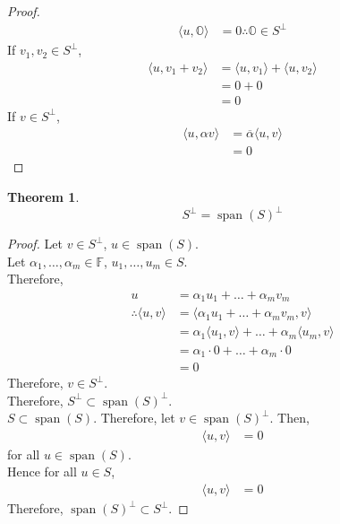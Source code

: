 \documentclass[fleqn, a4paper, 12pt]{article}
\DeclareMathOperator{\vspan}{\mathrm{span}} %
\theoremstyle{definition}
\theoremstyle{theorem}
\newtheorem{theorem}{Theorem} %
\theoremstyle{remark}
\numberwithin{corollary}{theorem}
\numberwithin{equation}{theorem}
\begin{document}
\begin{proof}
	\begin{align*}
		\langle u, \mathbb{O} \rangle &= 0
		\therefore \mathbb{O} \in S^{\perp}
	\end{align*}
	If $v_1, v_2 \in S^{\perp}$, 
	\begin{align*}
		\langle u, v_1 + v_2 \rangle &= \langle u, v_1 \rangle + \langle u, v_2 \rangle\\
		&= 0 + 0\\
		&= 0
	\end{align*}
	If $v \in S^{\perp}$,
	\begin{align*}
		\langle u, \alpha v \rangle &= \overline{\alpha} \langle u, v \rangle\\
		&= 0
	\end{align*}
\end{proof}

\begin{theorem}
	\begin{equation*}
		S^{\perp} = \vspan(S)^{\perp}
	\end{equation*}
\end{theorem}

\begin{proof}
	Let $v \in S^{\perp}$, $u \in \vspan(S)$.\\
	Let $\alpha_1, \dots, \alpha_m \in \mathbb{F}$, $u_1, \dots, u_m \in S$.\\
	Therefore,
	\begin{align*}
		u &= \alpha_1 u_1 + \dots + \alpha_m v_m\\
		\therefore \langle u, v \rangle &= \langle \alpha_1 u_1 + \dots + \alpha_m v_m, v \rangle\\
		&= \alpha_1 \langle u_1, v \rangle + \dots + \alpha_m \langle u_m, v \rangle\\
		&= \alpha_1 \cdot 0 + \dots + \alpha_m \cdot 0\\
		&= 0
	\end{align*}
	Therefore, $v \in S^{\perp}$.\\
	Therefore, $S^{\perp} \subset \vspan(S)^{\perp}$.\\
	$S \subset \vspan (S)$. Therefore, let $v \in \vspan(S)^{\perp}$. Then, 
	\begin{align*}
		\langle u, v \rangle &= 0
	\end{align*}
	for all $u \in \vspan(S)$.\\
	Hence for all $u \in S$,
	\begin{align*}
		\langle u, v \rangle &= 0
	\end{align*}
	Therefore, $\vspan(S)^{\perp} \subset S^{\perp}$.
\end{proof}
\end{document}
